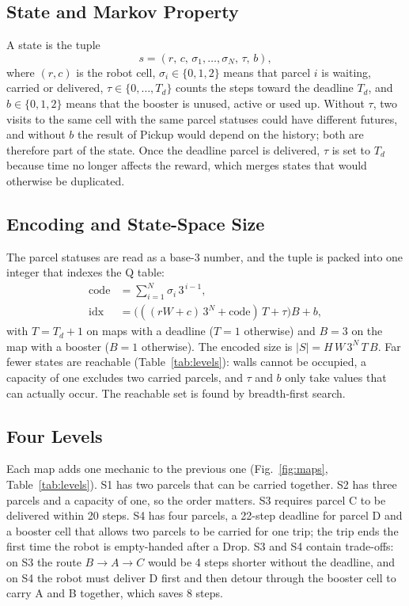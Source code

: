 \documentclass[conference]{IEEEtran}
\begin{document}
\subsection{State and Markov Property}
A state is the tuple
\begin{equation}
s=(r,\,c,\,\sigma_1,\dots,\sigma_N,\,\tau,\,b),\label{eq:state}
\end{equation}
where $(r,c)$ is the robot cell, $\sigma_i\in\{0,1,2\}$ means that parcel $i$ is waiting, carried or delivered, $\tau\in\{0,\dots,T_d\}$ counts the steps toward the deadline $T_d$, and $b\in\{0,1,2\}$ means that the booster is unused, active or used up. Without $\tau$, two visits to the same cell with the same parcel statuses could have different futures, and without $b$ the result of Pickup would depend on the history; both are therefore part of the state. Once the deadline parcel is delivered, $\tau$ is set to $T_d$ because time no longer affects the reward, which merges states that would otherwise be duplicated.

\subsection{Encoding and State-Space Size}
The parcel statuses are read as a base-3 number, and the tuple is packed into one integer that indexes the Q table:
\begin{align}
\mathrm{code}&=\textstyle\sum_{i=1}^{N}\sigma_i\,3^{\,i-1},\\
\mathrm{idx}&=\big(((rW+c)\,3^{N}+\mathrm{code})\,T+\tau\big)B+b,\label{eq:idx}
\end{align}
with $T=T_d+1$ on maps with a deadline ($T=1$ otherwise) and $B=3$ on the map with a booster ($B=1$ otherwise). The encoded size is $|S|=H\,W\,3^{N}\,T\,B$. Far fewer states are reachable (Table~\ref{tab:levels}): walls cannot be occupied, a capacity of one excludes two carried parcels, and $\tau$ and $b$ only take values that can actually occur. The reachable set is found by breadth-first search.

\subsection{Four Levels}
Each map adds one mechanic to the previous one (Fig.~\ref{fig:maps}, Table~\ref{tab:levels}). S1 has two parcels that can be carried together. S2 has three parcels and a capacity of one, so the order matters. S3 requires parcel C to be delivered within 20 steps. S4 has four parcels, a 22-step deadline for parcel D and a booster cell that allows two parcels to be carried for one trip; the trip ends the first time the robot is empty-handed after a Drop. S3 and S4 contain trade-offs: on S3 the route $B\rightarrow A\rightarrow C$ would be 4 steps shorter without the deadline, and on S4 the robot must deliver D first and then detour through the booster cell to carry A and B together, which saves 8 steps.
\end{document}
